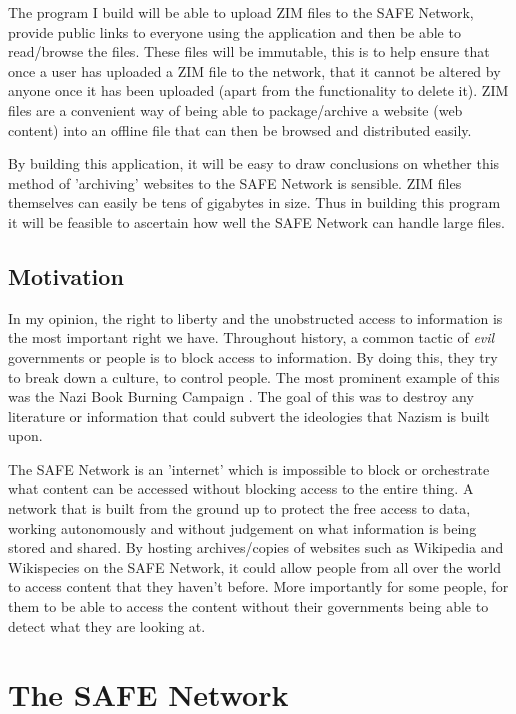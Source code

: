 \documentclass{l4proj}
\begin{document}
The program I build will be able to upload ZIM\cite{zim} files to the SAFE Network, provide public links to everyone using the application and then be able to read/browse the files. These files will be immutable, this is to help ensure that once a user has uploaded a ZIM file to the network, that it cannot be altered by anyone once it has been uploaded (apart from the functionality to delete it). ZIM files are a convenient way of being able to package/archive a website (web content) into an offline file that can then be browsed and distributed easily.

By building this application, it will be easy to draw conclusions on whether this method of 'archiving' websites to the SAFE Network is sensible. ZIM files themselves can easily be tens of gigabytes in size. Thus in building this program it will be feasible to ascertain how well the SAFE Network can handle large files.

\section{Motivation}

In my opinion, the right to liberty and the unobstructed access to information is the most important right we have. Throughout history, a common tactic of \textit{evil} governments or people is to block access to information. By doing this, they try to break down a culture, to control people. The most prominent example of this was the Nazi Book Burning Campaign \cite{book-burning}. The goal of this was to destroy any literature or information that could subvert the ideologies that Nazism is built upon.

The SAFE Network is an 'internet' which is impossible to block or orchestrate what content can be accessed without blocking access to the entire thing. A network that is built from the ground up to protect the free access to data, working autonomously and without judgement on what information is being stored and shared. By hosting archives/copies of websites such as Wikipedia and Wikispecies on the SAFE Network, it could allow people from all over the world to access content that they haven't before. More importantly for some people, for them to be able to access the content without their governments being able to detect what they are looking at.

\chapter{The SAFE Network}
\label{ch:thesafenetwork}
\end{document}
